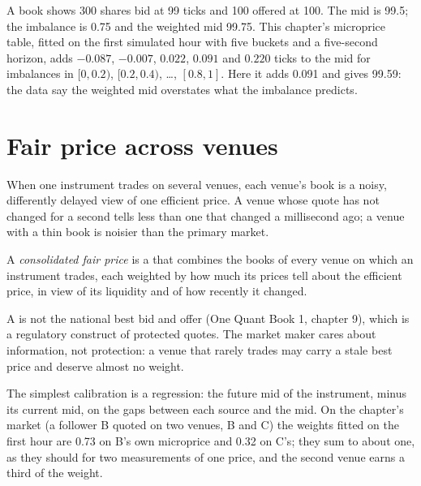 \begin{example}\label{ex:hf:fair-value:three}
A book shows 300 shares bid at 99 ticks and 100 offered at 100. The mid is 99.5; the imbalance is 0.75 and the weighted mid 99.75. This chapter's
microprice table, fitted on the first simulated hour with five buckets and a five-second horizon, adds $-0.087$, $-0.007$, $0.022$, $0.091$ and
$0.220$ ticks to the mid for imbalances in $[0,0.2)$, $[0.2,0.4)$, \dots, $[0.8,1]$. Here it adds 0.091 and gives 99.59: the data say the weighted
mid overstates what the imbalance predicts.
\end{example}

\section{Fair price across venues}

When one instrument trades on several venues, each venue's book is a noisy, differently delayed view of one efficient price. A venue whose quote
has not changed for a second tells less than one that changed a millisecond ago; a venue with a thin book is noisier than the primary market.

\begin{definition}\label{def:hf:fair-value:consolidated}
A \emph{consolidated fair price} is a  that combines the books of every venue on which an instrument
trades, each weighted by how much its prices tell about the efficient price, in view of its liquidity and of how recently it changed.
\end{definition}

A  is not the national best bid and offer (One Quant Book 1, chapter 9), which is a regulatory construct of protected quotes.
The market maker cares about information, not protection: a venue that rarely trades may carry a stale best price and deserve almost no weight.

The simplest calibration is a regression: the future mid of the instrument, minus its current mid, on the gaps between each source and the mid.
On the chapter's market (a follower B quoted on two venues, B and C) the weights fitted on the first hour are 0.73 on B's own microprice and 0.32 on
C's; they sum to about one, as they should for two measurements of one price, and the second venue earns a third of the weight.

